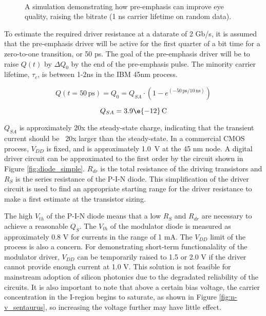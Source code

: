 	\begin{figure}[H]
		\begin{center}
		\\
		\caption{\label{fig:eye} A simulation demonstrating how pre-emphasis can improve eye quality, raising the bitrate (1 ns carrier lifetime on random data).}
		\end{center}
	\end{figure}

To estimate the required driver resistance at a datarate of 2 Gb/s, it is assumed that the pre-emphasis driver will be active for the first quarter of a bit time for a zero-to-one transition, or 50 ps.  The goal of the pre-emphasis driver will be to raise $Q(t)$ by $\Delta Q_0$ by the end of the pre-emphasis pulse.  The minority carrier lifetime, $\tau_c$, is between 1-2ns in the IBM 45nm process.

	\begin{equation}
Q(t = 50 \, \mbox{ps}) = Q_0 = Q_{SA} \cdot (1 - e^{(-50 \, \mbox{ps} / 10 \, \mbox{ns})})
	\end{equation}

	\begin{equation}
Q_{SA} = 3.9\e{-12} \, \mbox{C}
	\end{equation}



$Q_{SA}$ is approximately 20x the steady-state charge, indicating that the transient current should be ~20x larger than the steady-state.  In a commercial CMOS process, $V_{DD}$ is fixed, and is approximately \mbox{1.0 V} at the 45 nm node.  A digital driver circuit can be approximated to the first order by the circuit shown in Figure \ref{fig:diode_simple}.  $R_{dr}$ is the total resistance of the driving transistors and $R_S$ is the series resistance of the P-I-N diode.  This simplification of the driver circuit is used to find an appropriate starting range for the driver resistance to make a first estimate at the transistor sizing.  




The high $V_{th}$ of the P-I-N diode means that a low $R_S$ and $R_{dr}$ are necessary to achieve a reasonable $Q_S$.  The $V_{th}$ of the modulator diode is measured as approximately 0.8 V for currents in the range of 1 mA.  The $V_{DD}$ limit of the process is also a concern.  For demonstrating short-term functionalality of the modulator driver, $V_{DD}$ can be temporarily raised to 1.5 or 2.0 V if the driver cannot provide enough current at 1.0 V.  This solution is not feasible for mainstream adoption of silicon photonics due to the degradated reliability of the circuits.   It is also important to note that above a certain bias voltage, the carrier concentration in the I-region begins to saturate, as shown in Figure \ref{fig:n-v_sentaurus}, so increasing the voltage further may have little effect.

